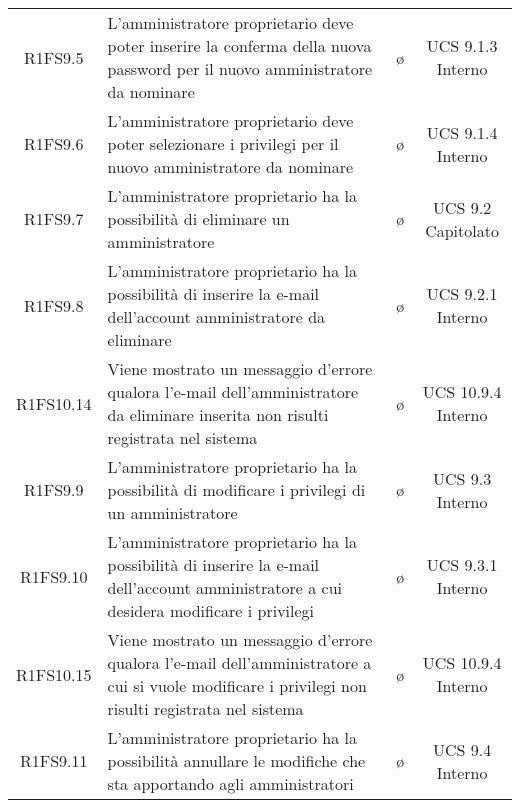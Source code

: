 {\begin{longtable}{ c C{8cm} c c}
R1FS9.5 & L'amministratore proprietario deve poter inserire la conferma della nuova password per il nuovo amministratore da nominare & \o & UCS 9.1.3 Interno\\

R1FS9.6 & L'amministratore proprietario deve poter selezionare i privilegi per il nuovo amministratore da nominare & \o & UCS 9.1.4 Interno\\

R1FS9.7 & L'amministratore proprietario ha la possibilità di eliminare un amministratore & \o & UCS 9.2 Capitolato\\

R1FS9.8 & L'amministratore proprietario ha la possibilità di inserire la e-mail dell'account amministratore da eliminare & \o & UCS 9.2.1 Interno\\

R1FS10.14 & Viene mostrato un messaggio d'errore qualora l'e-mail dell'amministratore da eliminare inserita non risulti registrata nel sistema & \o & UCS 10.9.4 Interno\\

R1FS9.9 & L'amministratore proprietario ha la possibilità di modificare i privilegi di un amministratore & \o & UCS 9.3 Interno\\

R1FS9.10 & L'amministratore proprietario ha la possibilità di inserire la e-mail dell'account amministratore a cui desidera modificare i privilegi & \o & UCS 9.3.1 Interno\\

R1FS10.15 & Viene mostrato un messaggio d'errore qualora l'e-mail dell'amministratore a cui si vuole modificare i privilegi non risulti registrata nel sistema & \o & UCS 10.9.4 Interno\\

R1FS9.11 & L'amministratore proprietario ha la possibilità annullare le modifiche che sta apportando agli amministratori & \o & UCS 9.4 Interno\\

\end{longtable}
}
